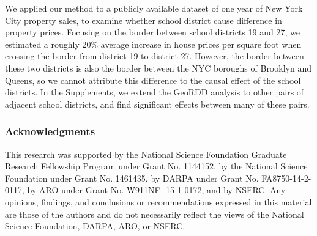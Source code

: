 \documentclass{article}
\begin{document}
We applied our method to a publicly available dataset of one year of New York City property sales, to examine whether school district cause difference in property prices.
Focusing on the border between school districts 19 and 27, we estimated a roughly 20\% average increase in house prices per square foot when crossing the border from district 19 to district 27.
However, the border between these two districts is also the border between the NYC boroughs of Brooklyn and Queens, so we cannot attribute this difference to the causal effect of the school districts.
In the Supplements, we extend the GeoRDD analysis to other pairs of adjacent school districts, and find significant effects between many of these pairs.

\newpage
\subsubsection*{Acknowledgments}
This research was supported by the National Science Foundation Graduate Research Fellowship Program under Grant No. 1144152, by the National Science Foundation under Grant No. 1461435, by DARPA under Grant No. FA8750-14-2-0117, by ARO under Grant No. W911NF- 15-1-0172, and by NSERC. Any opinions, findings, and conclusions or recommendations expressed in this material are those of the authors and do not necessarily reflect the views of the National Science Foundation, DARPA, ARO, or NSERC.




\end{document}
